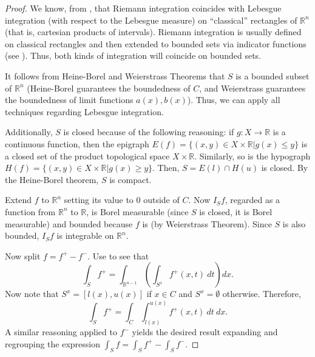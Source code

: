 \begin{proof}
    We know, from , that Riemann integration coincides with Lebesgue integration (with respect to the Lebesgue measure) on ``classical'' rectangles of \(\mathbb{R}^n\) (that is, cartesian products of intervals). Riemann integration is usually defined on classical rectangles and then extended to bounded sets via indicator functions (see \cite{apuntes_Manolo}). Thus, both kinds of integration will coincide on bounded sets.

    It follows from Heine-Borel and Weierstrass Theorems that \(S\) is a bounded subset of \(\mathbb{R}^n\) (Heine-Borel guarantees the boundedness of \(C\), and Weierstrass guarantees the boundedness of limit functions \(a(x),b(x)\)). Thus, we can apply all techniques regarding Lebesgue integration.

    Additionally, \(S\) is closed because of the following reasoning:
if \(g\colon X\to \mathbb{R}\) is a continuous function, then the epigraph \(E(f)=\{(x,y)\in X\times\mathbb{R}\left|g(x)\leq y\right.\}\) is a closed set of the product topological space \(X\times \mathbb{R}\). Similarly, so is the hypograph \(H(f)=\{(x,y)\in X\times\mathbb{R}\left|g(x)\geq y\right.\}\). Then, \(S=E(l)\cap H(u)\) is closed. By the Heine-Borel theorem, \(S\) is compact.

    Extend \(f\) to \(\mathbb{R}^n\) setting its value to \(0\) outside of \(C\). Now \(I_Sf\), regarded as a function from \(\mathbb{R}^n\) to \(\mathbb{R}\), is Borel measurable (since \(S\) is closed, it is Borel measurable) and bounded because \(f\) is (by Weierstrass Theorem). Since \(S\) is also bounded, \(I_Sf\) is integrable on \(\mathbb{R}^n\).

    Now split \(f=f^{+}-f^{-}\). Use  to see that
    \[
        \int_{S}f^{+}=\int_{\mathbb{R}^{n-1}}\left(\int_{S^{x}}f^{+}(x,t)~dt\right)dx
    .\]
    Now note that \(S^x=[l(x),u(x)]\) if \(x\in C\) and \(S^x=\emptyset\) otherwise. Therefore,
    \[
        \int_{S}f^{+}=\int_{C}\int_{l(x)}^{u(x)}f^{+}(x,t)~dt~dx
    .\]
    A similar reasoning applied to \(f^{-}\) yields the desired result expanding and regrouping the expression \(\int_{S}f=\int_{S}f^{+}-\int_{S}f^{-}\).
\end{proof}
